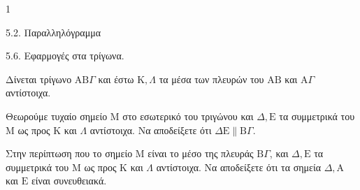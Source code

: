 \begin{ylh}{1}
    \item 5.2. Παραλληλόγραμμα
    \item 5.6. Εφαρμογές στα τρίγωνα.
\end{ylh}
Δίνεται τρίγωνο $\mathrm{A}\mathrm{B}\Gamma$ και έστω $\mathrm{K}, \Lambda$ τα μέσα των πλευρών του $\mathrm{A}\mathrm{B}$ και $\mathrm{A}\Gamma$ αντίστοιχα.
\begin{alist}
    \item Θεωρούμε τυχαίο σημείο $\mathrm{M}$ στο εσωτερικό του τριγώνου και $\Delta, \mathrm{E}$ τα συμμετρικά του $\mathrm{M}$ ως προς $\mathrm{K}$ και $\Lambda$ αντίστοιχα. Να αποδείξετε ότι $\Delta\mathrm{E} \parallel \mathrm{B}\Gamma$. 
    \item Στην περίπτωση που το σημείο $\mathrm{M}$ είναι το μέσο της πλευράς $\mathrm{B}\Gamma$, και $\Delta, \mathrm{E}$ τα συμμετρικά του $\mathrm{M}$ ως προς $\mathrm{K}$ και $\Lambda$ αντίστοιχα. Να αποδείξετε ότι τα σημεία $\Delta, \mathrm{A}$ και $\mathrm{E}$ είναι συνευθειακά. 
\end{alist}
